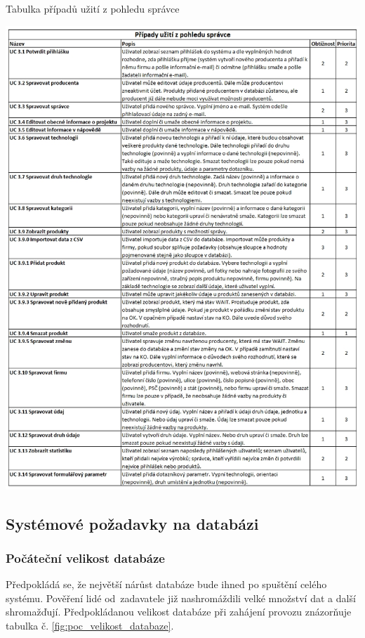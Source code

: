 \documentclass[11pt,a4paper]{article}
\begin{document}
\begin{table}[H] 
\centering 
\caption{Tabulka případů užití z pohledu správce} 
\includegraphics[scale=0.5]{vize_DTOZE_UC_3} 
\label{fig:UC_tabulka_A}
\end{table} 
 
\subsection{Systémové požadavky na databázi}
\subsubsection{Počáteční velikost databáze}
Předpokládá se, že největší nárůst databáze bude ihned po spuštění celého systému. Pověření lidé od~zadavatele již nashromáždili velké množství dat a další shromažďují.  Předpokládanou velikost databáze při zahájení provozu znázorňuje tabulka č. \ref{fig:poc_velikost_databaze}. 
\end{document}
